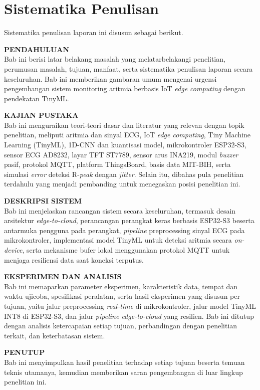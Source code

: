 \section{Sistematika Penulisan}

Sistematika penulisan laporan ini disusun sebagai berikut.

\noindent
\textbf{PENDAHULUAN}\\
\hspace*{1.5cm} Bab ini berisi latar belakang masalah yang melatarbelakangi penelitian, perumusan masalah, tujuan, manfaat, serta sistematika penulisan laporan secara keseluruhan. Bab ini memberikan gambaran umum mengenai urgensi pengembangan sistem monitoring aritmia berbasis IoT \textit{edge computing} dengan pendekatan TinyML.

\noindent
\textbf{KAJIAN PUSTAKA}\\
\hspace*{1.5cm} Bab ini menguraikan teori-teori dasar dan literatur yang relevan dengan topik penelitian, meliputi aritmia dan sinyal ECG, IoT \textit{edge computing}, Tiny Machine Learning (TinyML), 1D-CNN dan kuantisasi model, mikrokontroler ESP32-S3, sensor ECG AD8232, layar TFT ST7789, sensor arus INA219, modul \textit{buzzer} pasif, protokol MQTT, platform ThingsBoard, basis data MIT-BIH, serta simulasi \textit{error} deteksi R-\textit{peak} dengan \textit{jitter}. Selain itu, dibahas pula penelitian terdahulu yang menjadi pembanding untuk menegaskan posisi penelitian ini.

\noindent
\textbf{DESKRIPSI SISTEM}\\
\hspace*{1.5cm} Bab ini menjelaskan rancangan sistem secara keseluruhan, termasuk desain arsitektur \textit{edge-to-cloud}, perancangan perangkat keras berbasis ESP32-S3 beserta antarmuka pengguna pada perangkat, \textit{pipeline} preprocessing sinyal ECG pada mikrokontroler, implementasi model TinyML untuk deteksi aritmia secara \textit{on-device}, serta mekanisme bufer lokal menggunakan protokol MQTT untuk menjaga resiliensi data saat koneksi terputus.

\noindent
\textbf{EKSPERIMEN DAN ANALISIS}\\
\hspace*{1.5cm} Bab ini memaparkan parameter eksperimen, karakteristik data, tempat dan waktu ujicoba, spesifikasi peralatan, serta hasil eksperimen yang disusun per tujuan, yaitu jalur preprocessing \textit{real-time} di mikrokontroler, jalur model TinyML INT8 di ESP32-S3, dan jalur \textit{pipeline edge-to-cloud} yang resilien. Bab ini ditutup dengan analisis ketercapaian setiap tujuan, perbandingan dengan penelitian terkait, dan keterbatasan sistem.

\noindent
\textbf{PENUTUP}\\
\hspace*{1.5cm} Bab ini menyimpulkan hasil penelitian terhadap setiap tujuan beserta temuan teknis utamanya, kemudian memberikan saran pengembangan di luar lingkup penelitian ini.
